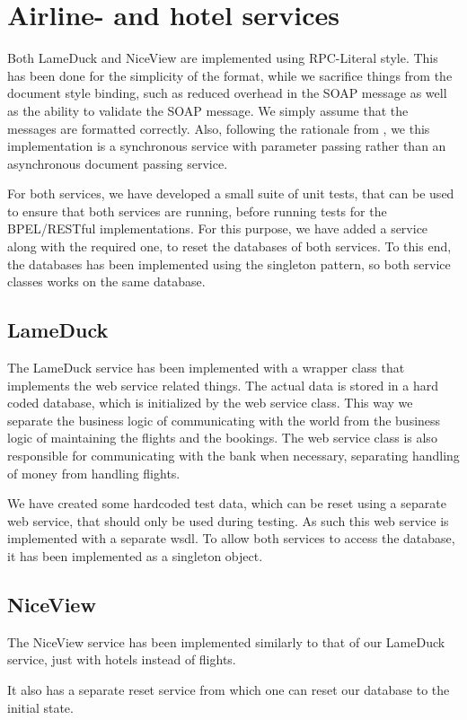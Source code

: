 \section{Airline- and hotel services}
Both LameDuck and NiceView are implemented using RPC-Literal style. This has been done for the simplicity of the format, while we sacrifice things from the document style binding, such as reduced overhead in the SOAP message as well as the ability to validate the SOAP message. We simply assume that the messages are formatted correctly.
Also, following the rationale from \cite{papazoglou2008web}, we this implementation is a synchronous service with parameter passing rather than an asynchronous document passing service.

For both services, we have developed a small suite of unit tests, that can be used to ensure that both services are running, before running tests for the BPEL/RESTful implementations. For this purpose, we have added a service along with the required one, to reset the databases of both services. To this end, the databases has been implemented using the singleton pattern, so both service classes works on the same database.


\subsection{LameDuck}
The LameDuck service has been implemented with a wrapper class that implements the web service related things. The actual data is stored in a hard coded database, which is initialized by the web service class. This way we separate the business logic of communicating with the world from the business logic of maintaining the flights and the bookings. The web service class is also responsible for communicating with the bank when necessary, separating handling of money from handling flights.

We have created some hardcoded test data, which can be reset using a separate web service, that should only be used during testing. As such this web service is implemented with a separate wsdl. To allow both services to access the database, it has been implemented as a singleton object.


\subsection{NiceView}
The NiceView service has been implemented similarly to that of our LameDuck service, just with hotels instead of flights.

It also has a separate reset service from which one can reset our database to the initial state.


